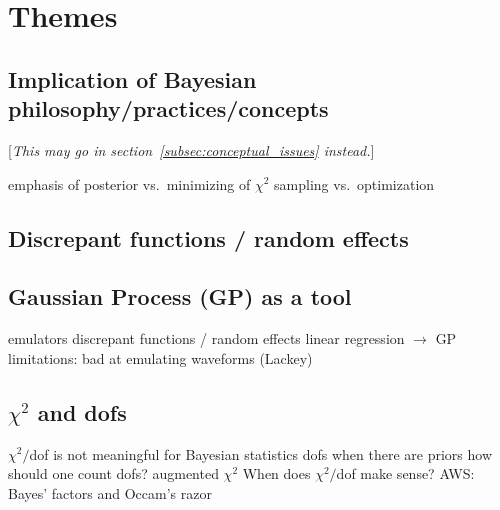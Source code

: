 \section{Themes}  \label{sec:themes}


\subsection{Implication of Bayesian philosophy/practices/concepts}  \label{subsec:implications}

[\emph{This may go in section~\ref{subsec:conceptual_issues} instead.}]

\bi
  \I emphasis of posterior vs.\ minimizing of $\chi^2$
  \I sampling vs.\ optimization  
\ei

\subsection{Discrepant functions / random effects}  \label{subsec:discrepant}


\subsection{Gaussian Process (GP) as a tool}  \label{subsec:GP_tool}

\bi
  \I emulators
  \I discrepant functions / random effects 
  \I linear regression $\rightarrow$ GP
  \I limitations: bad at emulating waveforms (Lackey)
\ei


\subsection{$\chi^2$ and dofs}  \label{subsec:}

   \bi 
       \I $\chi^2/$dof is not meaningful for Bayesian statistics
       \I dofs when there are priors
       \I how should one count dofs?
       \I augmented $\chi^2$
       \I When does $\chi^2/$dof make sense?
       \I AWS: Bayes' factors and Occam's razor
   \ei    

